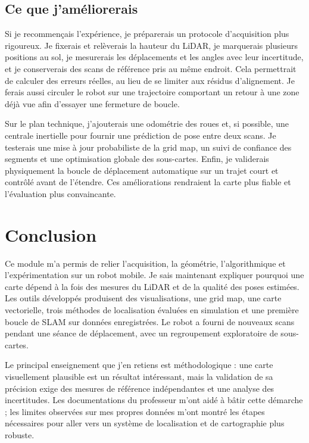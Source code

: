 \documentclass[11pt,a4paper]{article}
\begin{document}
\subsection{Ce que j'améliorerais}
Si je recommençais l'expérience, je préparerais un protocole d'acquisition plus rigoureux. Je fixerais et relèverais la hauteur du LiDAR, je marquerais plusieurs positions au sol, je mesurerais les déplacements et les angles avec leur incertitude, et je conserverais des scans de référence pris au même endroit. Cela permettrait de calculer des erreurs réelles, au lieu de se limiter aux résidus d'alignement. Je ferais aussi circuler le robot sur une trajectoire comportant un retour à une zone déjà vue afin d'essayer une fermeture de boucle.

Sur le plan technique, j'ajouterais une odométrie des roues et, si possible, une centrale inertielle pour fournir une prédiction de pose entre deux scans. Je testerais une mise à jour probabiliste de la grid map, un suivi de confiance des segments et une optimisation globale des sous-cartes. Enfin, je validerais physiquement la boucle de déplacement automatique sur un trajet court et contrôlé avant de l'étendre. Ces améliorations rendraient la carte plus fiable et l'évaluation plus convaincante.

\section{Conclusion}
Ce module m'a permis de relier l'acquisition, la géométrie, l'algorithmique et l'expérimentation sur un robot mobile. Je sais maintenant expliquer pourquoi une carte dépend à la fois des mesures du LiDAR et de la qualité des poses estimées. Les outils développés produisent des visualisations, une grid map, une carte vectorielle, trois méthodes de localisation évaluées en simulation et une première boucle de SLAM sur données enregistrées. Le robot a fourni de nouveaux scans pendant une séance de déplacement, avec un regroupement exploratoire de sous-cartes.

Le principal enseignement que j'en retiens est méthodologique : une carte visuellement plausible est un résultat intéressant, mais la validation de sa précision exige des mesures de référence indépendantes et une analyse des incertitudes. Les documentations du professeur m'ont aidé à bâtir cette démarche ; les limites observées sur mes propres données m'ont montré les étapes nécessaires pour aller vers un système de localisation et de cartographie plus robuste.
\end{document}
